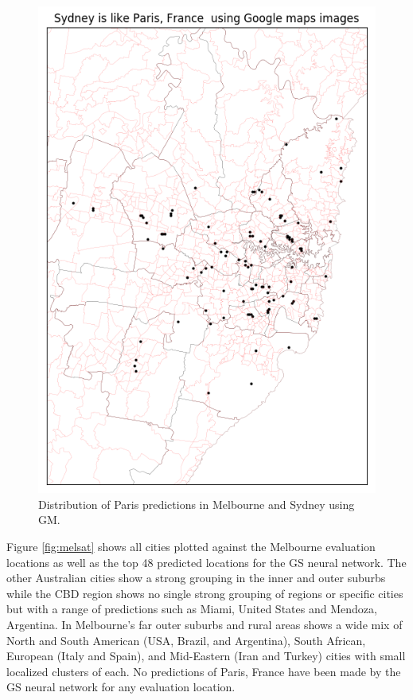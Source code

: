 \documentclass[sageh,times]{sagej}
\begin{document}
\begin{figure}[!htbp]
\includegraphics[scale=0.40]{Images/Sydney_Paris,France-GM.png} 
\caption{Distribution of Paris predictions in Melbourne and Sydney using GM.}    
 \label{fig:gm_melsyd_paris}  
\end{figure} 

Figure \ref{fig:melsat} shows all cities plotted against the Melbourne evaluation locations as well as the top 48 predicted locations for the GS neural network. The other Australian cities show a strong grouping in the inner and outer suburbs while the CBD region shows no single strong grouping of regions or specific cities but with a range of predictions such as Miami, United States and Mendoza, Argentina. In Melbourne's far outer suburbs and rural areas shows a wide mix of North and South American (USA, Brazil, and Argentina), South African, European (Italy and Spain), and Mid-Eastern (Iran and Turkey) cities with small localized clusters of each. No predictions of Paris, France have been made by the GS neural network for any evaluation location.
\end{document}
